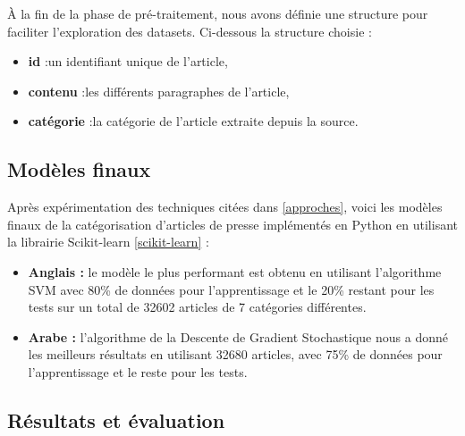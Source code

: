             À la fin de la phase de pré-traitement, nous avons définie une structure pour faciliter l'exploration des datasets. Ci-dessous la structure choisie :
                \begin{itemize}
                    \item{\textbf{id} :}un identifiant unique de l'article,
                    \item{\textbf{contenu} :}les différents paragraphes de l'article,
                    \item{\textbf{catégorie} :}la catégorie de l'article extraite depuis la source.
                \end{itemize}
    \subsection{Modèles finaux}
        Après expérimentation des techniques citées dans \ref{approches}, voici les modèles finaux de la catégorisation d'articles de presse implémentés en Python en utilisant la librairie Scikit-learn \ref{scikit-learn} :
        \begin{itemize}
            \item{\textbf{Anglais :} }le modèle le plus performant est obtenu en utilisant l'algorithme SVM avec 80\% de données pour l'apprentissage et le 20\% restant pour les tests sur un total de 32602 articles de 7 catégories différentes.\\

            \item{\textbf{Arabe :} }l'algorithme de la Descente de Gradient Stochastique nous a donné les meilleurs résultats en utilisant 32680 articles, avec 75\% de données pour l'apprentissage et le reste pour les tests. 
        \end{itemize}
    \subsection{Résultats et évaluation}
